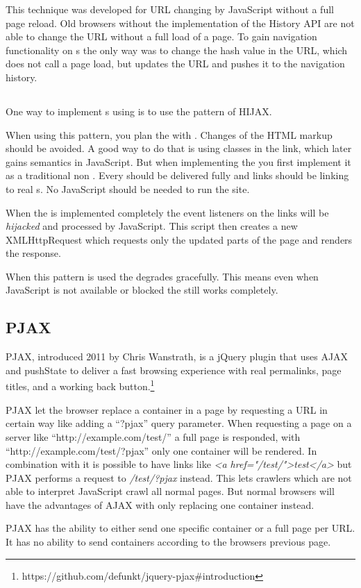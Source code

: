 This technique was developed for URL changing by JavaScript without a full page reload.
Old browsers without the implementation of the History API are not able to change the URL without a full load of a page.
To gain navigation functionality on \singlePageApplication{}s the only way was to change the hash value in the URL, which does not call a page load, but updates the URL and pushes it to the navigation history.

\subsection{\hijax{}}
One way to implement \singlePageApplication{}s using \ajax{} is to use the pattern of HIJAX.

When using this pattern, you plan the \webSite{} with \ajax{}.
Changes of the HTML markup should be avoided.
A good way to do that is using classes in the link, which later gains semantics in JavaScript.
But when implementing the \webSite{} you first implement it as a traditional non \ajax{} \webSite{}.
Every \webPage{} should be delivered fully and links should be linking to real \webPage{}s.
No JavaScript should be needed to run the site.

When the \webSite{} is implemented completely the event listeners on the links will be \emph{hijacked} and processed by JavaScript.
This script then creates a new XMLHttpRequest which requests only the updated parts of the page and renders the response.

When this pattern is used the \webSite{} degrades gracefully.
This means even when JavaScript is not available or blocked the \webSite{} still works completely.

\subsection{PJAX\label{pjax}}
PJAX, introduced 2011 by Chris Wanstrath, is a jQuery plugin that uses AJAX and pushState to deliver a fast browsing experience with real permalinks, page titles, and a working back button.\footnote{https://github.com/defunkt/jquery-pjax\#introduction}

PJAX let the browser replace a container in a page by requesting a URL in certain way like adding a \enquote{?pjax} query parameter.
When requesting a page on a server like \enquote{http://example.com/test/} a full page is responded, with \enquote{http://example.com/test/?pjax} only one container will be rendered.
In combination with \hijax{} it is possible to have links like \emph{<a href="/test/">test</a>} but PJAX performs a request to \emph{/test/?pjax} instead.
This lets crawlers which are not able to interpret JavaScript crawl all normal pages.
But normal browsers will have the advantages of AJAX with only replacing one container instead.

PJAX has the ability to either send one specific container or a full page per URL. It has no ability to send containers according to the browsers previous page.
